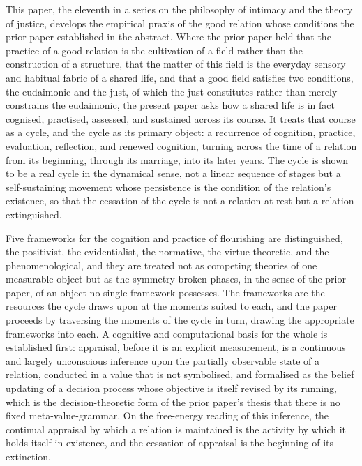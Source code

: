 \noindent
This paper, the eleventh in a series on the philosophy of intimacy and the theory of justice, develops the empirical praxis of the good relation whose conditions the prior paper established in the abstract. Where the prior paper held that the practice of a good relation is the cultivation of a field rather than the construction of a structure, that the matter of this field is the everyday sensory and habitual fabric of a shared life, and that a good field satisfies two conditions, the eudaimonic and the just, of which the just constitutes rather than merely constrains the eudaimonic, the present paper asks how a shared life is in fact cognised, practised, assessed, and sustained across its course. It treats that course as a cycle, and the cycle as its primary object: a recurrence of cognition, practice, evaluation, reflection, and renewed cognition, turning across the time of a relation from its beginning, through its marriage, into its later years. The cycle is shown to be a real cycle in the dynamical sense, not a linear sequence of stages but a self-sustaining movement whose persistence is the condition of the relation's existence, so that the cessation of the cycle is not a relation at rest but a relation extinguished.

Five frameworks for the cognition and practice of flourishing are distinguished, the positivist, the evidentialist, the normative, the virtue-theoretic, and the phenomenological, and they are treated not as competing theories of one measurable object but as the symmetry-broken phases, in the sense of the prior paper, of an object no single framework possesses. The frameworks are the resources the cycle draws upon at the moments suited to each, and the paper proceeds by traversing the moments of the cycle in turn, drawing the appropriate frameworks into each. A cognitive and computational basis for the whole is established first: appraisal, before it is an explicit measurement, is a continuous and largely unconscious inference upon the partially observable state of a relation, conducted in a value that is not symbolised, and formalised as the belief updating of a decision process whose objective is itself revised by its running, which is the decision-theoretic form of the prior paper's thesis that there is no fixed meta-value-grammar. On the free-energy reading of this inference, the continual appraisal by which a relation is maintained is the activity by which it holds itself in existence, and the cessation of appraisal is the beginning of its extinction.

